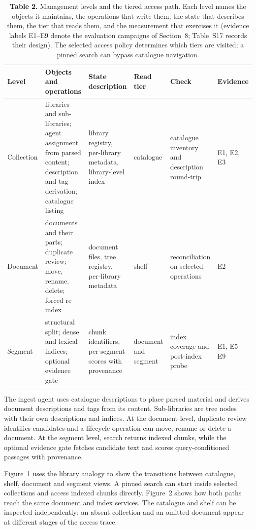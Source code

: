 \begin{table}
\centering
\small
\setlength{\tabcolsep}{4pt}
\renewcommand{\arraystretch}{1.15}
\caption{\textbf{Table 2.} Management levels and the tiered access path. Each level names the
objects it maintains, the operations that write them, the state that describes
them, the tier that reads them, and the measurement that exercises it
(evidence labels E1--E9 denote the evaluation campaigns of
Section~8; Table~S17 records their design). The selected access
policy determines which tiers are visited; a pinned
search can bypass catalogue navigation.}

\begin{tabular}{@{}p{1.980cm}p{3.465cm}p{2.970cm}p{1.980cm}p{1.980cm}p{2.145cm}@{}}
\toprule
Level & Objects and operations & State description & Read tier & Check & Evidence\\
\midrule
Collection & libraries and sub-libraries; agent assignment from parsed content; description and tag derivation; catalogue listing & library registry, per-library metadata, library-level index & catalogue & catalogue inventory and description round-trip & E1, E2, E3\\
Document & documents and their parts; duplicate review; move, rename, delete; forced re-index & document files, tree registry, per-library metadata & shelf & reconciliation on selected operations & E2\\
Segment & structural split; dense and lexical indices; optional evidence gate & chunk identifiers, per-segment scores with provenance & document and segment & index coverage and post-index probe & E1, E5--E9\\
\bottomrule
\end{tabular}
\end{table}

The ingest agent uses catalogue descriptions to place parsed material and
derives document descriptions and tags from its content. Sub-libraries are
tree nodes with their own descriptions and indices. At the document level,
duplicate review identifies candidates and a lifecycle operation can move,
rename or delete a document. At the segment level, search returns indexed
chunks, while the optional evidence gate fetches candidate text and scores
query-conditioned passages with provenance.

Figure~1 uses the library analogy to show the transitions
between catalogue, shelf, document and segment views. A pinned search can
start inside selected collections and access indexed chunks directly.
Figure~2 shows how both paths reach the same document and
index services. The catalogue and shelf can be inspected independently:
an absent collection and an omitted document appear at different stages
of the access trace.

